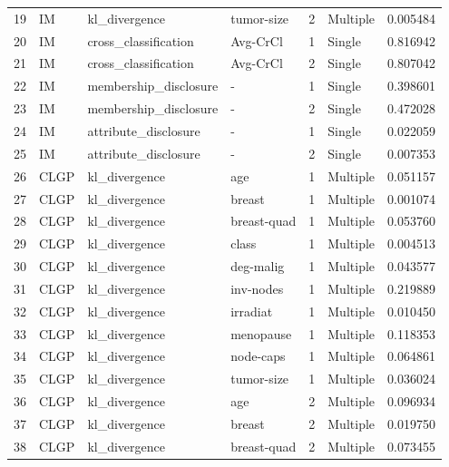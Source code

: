 \begin{tabular}{llllrlr}
19  &       IM &          kl\_divergence &   tumor-size &    2 &  Multiple &  0.005484 \\
20  &       IM &   cross\_classification &     Avg-CrCl &    1 &    Single &  0.816942 \\
21  &       IM &   cross\_classification &     Avg-CrCl &    2 &    Single &  0.807042 \\
22  &       IM &  membership\_disclosure &            - &    1 &    Single &  0.398601 \\
23  &       IM &  membership\_disclosure &            - &    2 &    Single &  0.472028 \\
24  &       IM &   attribute\_disclosure &            - &    1 &    Single &  0.022059 \\
25  &       IM &   attribute\_disclosure &            - &    2 &    Single &  0.007353 \\
26  &     CLGP &          kl\_divergence &          age &    1 &  Multiple &  0.051157 \\
27  &     CLGP &          kl\_divergence &       breast &    1 &  Multiple &  0.001074 \\
28  &     CLGP &          kl\_divergence &  breast-quad &    1 &  Multiple &  0.053760 \\
29  &     CLGP &          kl\_divergence &        class &    1 &  Multiple &  0.004513 \\
30  &     CLGP &          kl\_divergence &    deg-malig &    1 &  Multiple &  0.043577 \\
31  &     CLGP &          kl\_divergence &    inv-nodes &    1 &  Multiple &  0.219889 \\
32  &     CLGP &          kl\_divergence &     irradiat &    1 &  Multiple &  0.010450 \\
33  &     CLGP &          kl\_divergence &    menopause &    1 &  Multiple &  0.118353 \\
34  &     CLGP &          kl\_divergence &    node-caps &    1 &  Multiple &  0.064861 \\
35  &     CLGP &          kl\_divergence &   tumor-size &    1 &  Multiple &  0.036024 \\
36  &     CLGP &          kl\_divergence &          age &    2 &  Multiple &  0.096934 \\
37  &     CLGP &          kl\_divergence &       breast &    2 &  Multiple &  0.019750 \\
38  &     CLGP &          kl\_divergence &  breast-quad &    2 &  Multiple &  0.073455 \\

\end{tabular}
